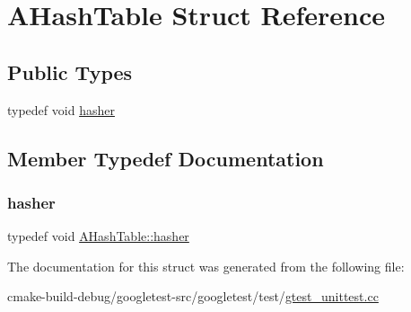 \hypertarget{structAHashTable}{}\section{A\+Hash\+Table Struct Reference}
\label{structAHashTable}
\subsection*{Public Types}
\begin{DoxyCompactItemize}
\item 
typedef void \mbox{\hyperlink{structAHashTable_af0df4ce57a783be396e80cb8df6b6259}{hasher}}
\end{DoxyCompactItemize}


\subsection{Member Typedef Documentation}
\mbox{\label{structAHashTable_af0df4ce57a783be396e80cb8df6b6259}} 
\subsubsection{\texorpdfstring{hasher}{hasher}}
{\footnotesize\ttfamily typedef void \mbox{\hyperlink{structAHashTable_af0df4ce57a783be396e80cb8df6b6259}{A\+Hash\+Table\+::hasher}}}



The documentation for this struct was generated from the following file\+:\begin{DoxyCompactItemize}
\item 
cmake-\/build-\/debug/googletest-\/src/googletest/test/\mbox{\hyperlink{gtest__unittest_8cc}{gtest\+\_\+unittest.\+cc}}\end{DoxyCompactItemize}
